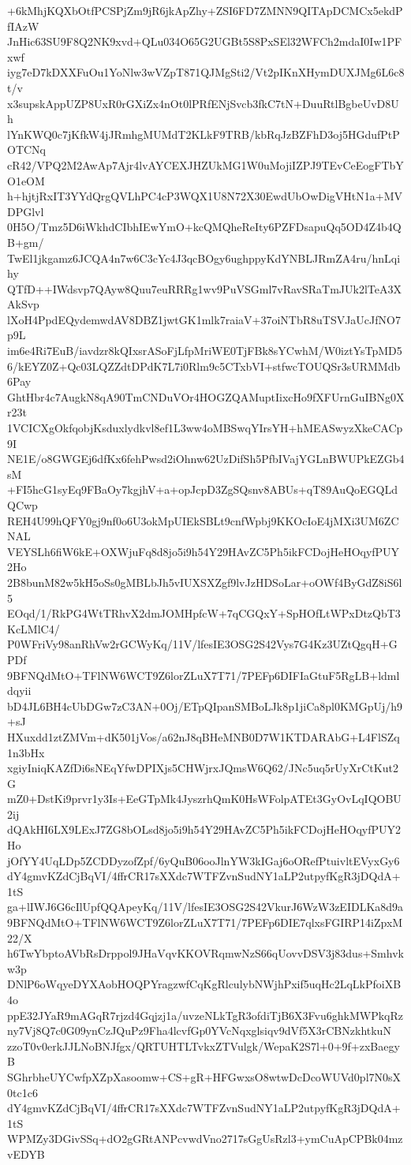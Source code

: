 +6kMhjKQXbOtfPCSPjZm9jR6jkApZhy+ZSI6FD7ZMNN9QITApDCMCx5ekdPfIAzW
JnHic63SU9F8Q2NK9xvd+QLu034O65G2UGBt5S8PxSEl32WFCh2mdaI0Iw1PFxwf
iyg7eD7kDXXFuOu1YoNlw3wVZpT871QJMgSti2/Vt2pIKnXHymDUXJMg6L6c8t/v
x3supskAppUZP8UxR0rGXiZx4nOt0lPRfENjSvcb3fkC7tN+DuuRtlBgbeUvD8Uh
lYnKWQ0c7jKfkW4jJRmhgMUMdT2KLkF9TRB/kbRqJzBZFhD3oj5HGdufPtPOTCNq
cR42/VPQ2M2AwAp7Ajr4lvAYCEXJHZUkMG1W0uMojiIZPJ9TEvCeEogFTbYO1eOM
h+hjtjRxIT3YYdQrgQVLhPC4cP3WQX1U8N72X30EwdUbOwDigVHtN1a+MVDPGlvl
0H5O/Tmz5D6iWkhdCIbhIEwYmO+kcQMQheReIty6PZFDsapuQq5OD4Z4b4QB+gm/
TwEl1jkgamz6JCQA4n7w6C3cYc4J3qcBOgy6ughppyKdYNBLJRmZA4ru/hnLqihy
QTfD++IWdsvp7QAyw8Quu7euRRRg1wv9PuVSGml7vRavSRaTmJUk2lTeA3XAkSvp
lXoH4PpdEQydemwdAV8DBZ1jwtGK1mlk7raiaV+37oiNTbR8uTSVJaUcJfNO7p9L
im6e4Ri7EuB/iavdzr8kQIxsrASoFjLfpMriWE0TjFBk8sYCwhM/W0iztYsTpMD5
6/kEYZ0Z+Qc03LQZZdtDPdK7L7i0Rlm9c5CTxbVI+stfwcTOUQSr3sURMMdb6Pay
GhtHbr4c7AugkN8qA90TmCNDuVOr4HOGZQAMuptIixcHo9fXFUrnGuIBNg0Xr23t
1VCICXgOkfqobjKsduxlydkvl8ef1L3ww4oMBSwqYIrsYH+hMEASwyzXkeCACp9I
NE1E/o8GWGEj6dfKx6fehPwsd2iOhnw62UzDifSh5PfbIVajYGLnBWUPkEZGb4sM
+FI5hcG1syEq9FBaOy7kgjhV+a+opJcpD3ZgSQsnv8ABUs+qT89AuQoEGQLdQCwp
REH4U99hQFY0gj9nf0o6U3okMpUIEkSBLt9cnfWpbj9KKOcIoE4jMXi3UM6ZCNAL
VEYSLh6fiW6kE+OXWjuFq8d8jo5i9h54Y29HAvZC5Ph5ikFCDojHeHOqyfPUY2Ho
2B8bunM82w5kH5oSs0gMBLbJh5vIUXSXZgf9lvJzHDSoLar+oOWf4ByGdZ8iS6l5
EOqd/1/RkPG4WtTRhvX2dmJOMHpfcW+7qCGQxY+SpHOfLtWPxDtzQbT3KcLMlC4/
P0WFriVy98anRhVw2rGCWyKq/11V/lfesIE3OSG2S42Vys7G4Kz3UZtQgqH+GPDf
9BFNQdMtO+TFlNW6WCT9Z6lorZLuX7T71/7PEFp6DIFIaGtuF5RgLB+ldmldqyii
bD4JL6BH4cUbDGw7zC3AN+0Oj/ETpQIpanSMBoLJk8p1jiCa8pl0KMGpUj/h9+sJ
HXuxdd1ztZMVm+dK501jVos/a62nJ8qBHeMNB0D7W1KTDARAbG+L4FlSZq1n3bHx
xgiyIniqKAZfDi6sNEqYfwDPIXjs5CHWjrxJQmsW6Q62/JNc5uq5rUyXrCtKut2G
mZ0+DstKi9prvr1y3Is+EeGTpMk4JyszrhQmK0HsWFolpATEt3GyOvLqIQOBU2ij
dQAkHI6LX9LExJ7ZG8bOLsd8jo5i9h54Y29HAvZC5Ph5ikFCDojHeHOqyfPUY2Ho
jOfYY4UqLDp5ZCDDyzofZpf/6yQuB06ooJlnYW3kIGaj6oORefPtuivltEVyxGy6
dY4gmvKZdCjBqVI/4ffrCR17sXXdc7WTFZvnSudNY1aLP2utpyfKgR3jDQdA+1tS
ga+lIWJ6G6cIlUpfQQApeyKq/11V/lfesIE3OSG2S42VkurJ6WzW3zEIDLKa8d9a
9BFNQdMtO+TFlNW6WCT9Z6lorZLuX7T71/7PEFp6DIE7qlxsFGIRP14iZpxM22/X
h6TwYbptoAVbRsDrppol9JHaVqvKKOVRqmwNzS66qUovvDSV3j83dus+Smhvkw3p
DNlP6oWqyeDYXAobHOQPYragzwfCqKgRlculybNWjhPxif5uqHc2LqLkPfoiXB4o
ppE32JYaR9mAGqR7rjzd4Gqjzj1a/uvzeNLkTgR3ofdiTjB6X3Fvu6ghkMWPkqRz
ny7Vj8Q7c0G09ynCzJQuPz9Fha4lcvfGp0YVcNqxglsiqv9dVf5X3rCBNzkhtkuN
zzoT0v0erkJJLNoBNJfgx/QRTUHTLTvkxZTVulgk/WepaK2S7l+0+9f+zxBaegyB
SGhrbheUYCwfpXZpXasoomw+CS+gR+HFGwxsO8wtwDcDcoWUVd0pl7N0sX0tc1c6
dY4gmvKZdCjBqVI/4ffrCR17sXXdc7WTFZvnSudNY1aLP2utpyfKgR3jDQdA+1tS
WPMZy3DGivSSq+dO2gGRtANPcvwdVno2717sGgUsRzl3+ymCuApCPBk04mzvEDYB
